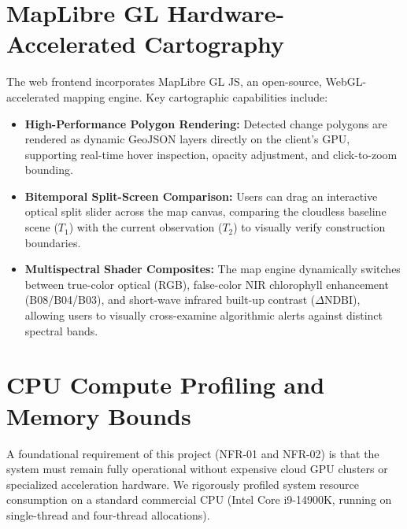 \section{MapLibre GL Hardware-Accelerated Cartography}
\label{sec:arch_maplibre}
The web frontend incorporates MapLibre GL JS, an open-source, WebGL-accelerated mapping engine. Key cartographic capabilities include:
\begin{itemize}
    \item \textbf{High-Performance Polygon Rendering:} Detected change polygons are rendered as dynamic GeoJSON layers directly on the client's GPU, supporting real-time hover inspection, opacity adjustment, and click-to-zoom bounding.
    \item \textbf{Bitemporal Split-Screen Comparison:} Users can drag an interactive optical split slider across the map canvas, comparing the cloudless baseline scene ($T_1$) with the current observation ($T_2$) to visually verify construction boundaries.
    \item \textbf{Multispectral Shader Composites:} The map engine dynamically switches between true-color optical (RGB), false-color NIR chlorophyll enhancement (B08/B04/B03), and short-wave infrared built-up contrast ($\Delta\text{NDBI}$), allowing users to visually cross-examine algorithmic alerts against distinct spectral bands.
\end{itemize}

\section{CPU Compute Profiling and Memory Bounds}
\label{sec:arch_profiling}
A foundational requirement of this project (NFR-01 and NFR-02) is that the system must remain fully operational without expensive cloud GPU clusters or specialized acceleration hardware. We rigorously profiled system resource consumption on a standard commercial CPU (Intel Core i9-14900K, running on single-thread and four-thread allocations).


